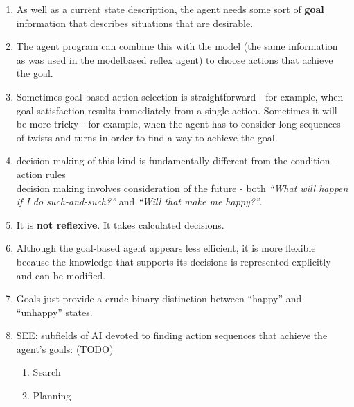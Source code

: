 \begin{enumerate}[itemsep=0.2cm]
    \item As well as a current state description, the agent needs some sort of \textbf{goal} information that describes situations that are desirable.
    \hfill \cite{ai/book/Artificial-Intelligence-A-Modern-Approach/Russell-Norvig}

    \item  The agent program can combine this with the model (the same information as was used in the modelbased reflex agent) to choose actions that achieve the goal.
    \hfill \cite{ai/book/Artificial-Intelligence-A-Modern-Approach/Russell-Norvig}

    \item Sometimes goal-based action selection is straightforward - for example, when goal satisfaction results immediately from a single action. Sometimes it will be more tricky - for example, when the agent has to consider long sequences of twists and turns in order to find a way to achieve the goal.
    \hfill \cite{ai/book/Artificial-Intelligence-A-Modern-Approach/Russell-Norvig}

    \item decision making of this kind is fundamentally different from the condition–action rules \\
    decision making involves consideration of the future - both \textit{“What will happen if I do such-and-such?”} and \textit{“Will that make me happy?”}.
    \hfill \cite{ai/book/Artificial-Intelligence-A-Modern-Approach/Russell-Norvig}

    \item It is \textbf{not reflexive}. It takes calculated decisions.

    \item Although the goal-based agent appears less efficient, it is more flexible because the knowledge that supports its decisions is represented explicitly and can be modified.
    \hfill \cite{ai/book/Artificial-Intelligence-A-Modern-Approach/Russell-Norvig}

    \item Goals just provide a crude binary distinction between “happy” and “unhappy” states.
    \hfill \cite{ai/book/Artificial-Intelligence-A-Modern-Approach/Russell-Norvig}

    \item SEE: subfields of AI devoted to finding action sequences that achieve the agent’s goals: (TODO)
    \begin{enumerate}
        \item Search
        \item Planning
    \end{enumerate}
\end{enumerate}

